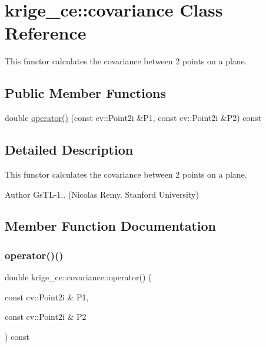 \hypertarget{classkrige__ce_1_1covariance}{}\section{krige\+\_\+ce\+:\+:covariance Class Reference}
\label{classkrige__ce_1_1covariance}


This functor calculates the covariance between 2 points on a plane.  


\subsection*{Public Member Functions}
\begin{DoxyCompactItemize}
\item 
double \hyperlink{classkrige__ce_1_1covariance_a3b1a5ef94ba3ec210c7a5f3cfbe7b165}{operator()} (const cv\+::\+Point2i \&P1, const cv\+::\+Point2i \&P2) const
\end{DoxyCompactItemize}


\subsection{Detailed Description}
This functor calculates the covariance between 2 points on a plane. 

\begin{DoxyAuthor}{Author}
Gs\+T\+L-\/1.. (Nicolas Remy. Stanford University) 
\end{DoxyAuthor}


\subsection{Member Function Documentation}
\mbox{\label{classkrige__ce_1_1covariance_a3b1a5ef94ba3ec210c7a5f3cfbe7b165}} 
\subsubsection{\texorpdfstring{operator()()}{operator()()}}
{\footnotesize\ttfamily double krige\+\_\+ce\+::covariance\+::operator() (\begin{DoxyParamCaption}\item[{const cv\+::\+Point2i \&}]{P1,  }\item[{const cv\+::\+Point2i \&}]{P2 }\end{DoxyParamCaption}) const\hspace{0.3cm}{\ttfamily [inline]}}


